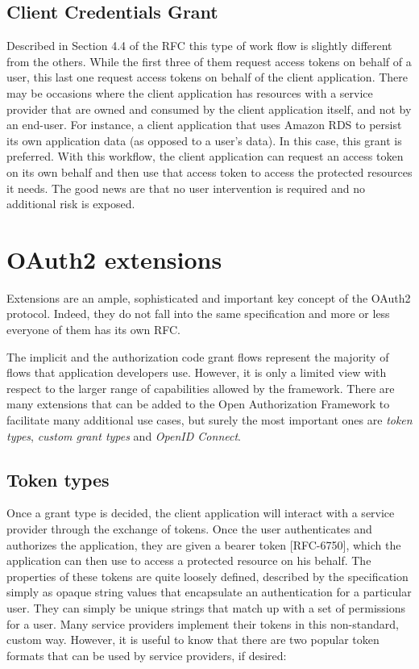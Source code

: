 \subsection{Client Credentials Grant}
Described in Section 4.4 of the RFC this type of work flow is slightly different from the others. While the first three of them request access tokens on behalf of a user, this last one request access tokens on behalf of the client application. There may be occasions where the client application has resources with a service provider that are owned and consumed by the client application itself, and not by an end-user. For instance, a client application that uses Amazon RDS to persist its own application data (as opposed to a user's data). In this case, this grant is preferred. With this workflow, the client application can request an access token on its own behalf and then use that access token to access the protected resources it needs. The good news are that no user intervention is required and no additional risk is exposed.

\section{OAuth2 extensions}
Extensions are an ample, sophisticated and important key concept of the OAuth2 protocol. Indeed, they do not fall into the same specification and more or less everyone of them has its own RFC.

The implicit and the authorization code grant flows represent the majority of flows that application developers use. However, it is only a limited view with respect to the larger range of capabilities allowed by the framework. There are many extensions that can be added to the Open Authorization Framework to facilitate many additional use cases, but surely the most important ones are \textit{token types}, \textit{custom grant types} and \textit{OpenID Connect}.

\subsection{Token types}
Once a grant type is decided, the client application will interact with a service provider through the exchange of tokens. Once the user authenticates and authorizes the application, they are given a bearer token [RFC-6750], which the application can then use to access a protected resource on his behalf. The properties of these tokens are quite loosely defined, described by the specification simply as opaque string values that encapsulate an authentication for a particular user. They can simply be unique strings that match up with a set of permissions for a user. Many service providers implement their tokens in this non-standard, custom way. However, it is useful to know that there are two popular token formats that can be used by service providers, if desired:

